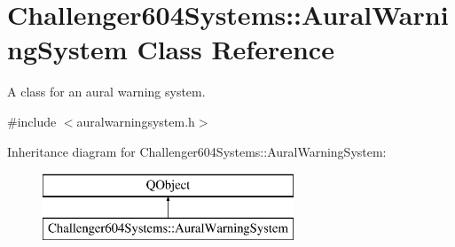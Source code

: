 \hypertarget{class_challenger604_systems_1_1_aural_warning_system}{\section{Challenger604\-Systems\-:\-:Aural\-Warning\-System Class Reference}
\label{class_challenger604_systems_1_1_aural_warning_system}
}


A class for an aural warning system.  




{\ttfamily \#include $<$auralwarningsystem.\-h$>$}

Inheritance diagram for Challenger604\-Systems\-:\-:Aural\-Warning\-System\-:\begin{figure}[H]
\begin{center}
\leavevmode
\includegraphics[height=2.000000cm]{class_challenger604_systems_1_1_aural_warning_system}
\end{center}
\end{figure}

